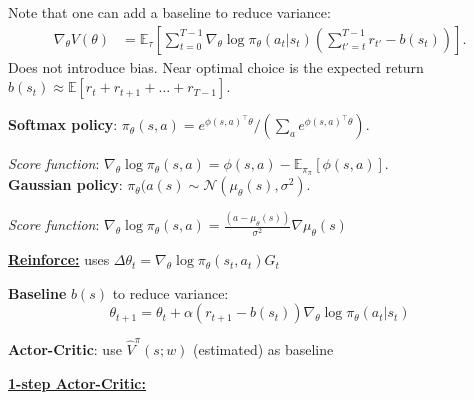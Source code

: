 \documentclass[10pt,landscape]{article}
\begin{document}
\begin{multicols}{3}
Note that one can add a baseline to reduce variance:
\begin{align*}
\nabla_\theta V(\theta)
&=
\mathbb{E}_\tau\left[
\sum_{t=0}^{T-1}\nabla_\theta \log \pi_\theta(a_t|s_t)
\left(\sum_{t'=t}^{T-1}r_{t'}-b(s_t)\right)
\right].
\end{align*}
Does not introduce bias. Near optimal choice is the  expected return
$b(s_t)\approx\mathbb{E}[r_t+r_{t+1}+\dots+r_{T-1}]$. 

\textbf{Softmax policy}: $\pi_\theta(s,a)=e^{\phi(s,a)^\top\theta}/\left(\sum\limits_a e^{\phi(s,a)^\top\theta}\right)$. 

\textit{Score function}: $\nabla_\theta\log\pi_\theta(s,a)=\phi(s,a)-\mathbb{E}_{\pi_\pi}[\phi(s,a)].
$
\\[2mm]

\textbf{Gaussian policy}: $\pi_\theta(a(s)\sim\mathcal{N}(\mu_\theta(s), \sigma^2)$. 

\textit{Score function}: $\nabla_\theta\log\pi_\theta(s,a)=
\frac{(a-\mu_\theta(s))}{\sigma^2}\nabla\mu_\theta(s)$

\vspace{2mm}






\vspace{2mm}

\underline{\textbf{Reinforce:}} uses $\Delta\theta_t=\nabla_\theta \log\pi_\theta(s_t,a_t)G_t$
\begin{algorithm}[H]
\end{algorithm}

\textbf{Baseline} $b(s)$ to reduce variance:
$$
\theta_{t+1}=\theta_t+\alpha(r_{t+1}-b(s_t))\nabla_\theta\log\pi_\theta(a_t|s_t)$$

\textbf{Actor-Critic}: use $\hat{V}^\pi(s;w)$ (estimated) as baseline

\vspace{2mm}

\underline{\textbf{1-step Actor-Critic:}}
\begin{algorithm}[H]
\end{algorithm}


\end{multicols}
\end{document}

